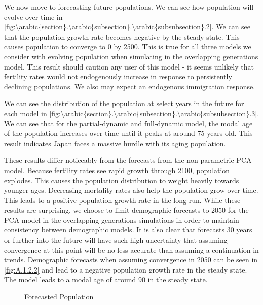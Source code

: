 \documentclass[10pt]{article}
\renewcommand{\thesection}{\arabic{section}}
\renewcommand{\thesubsection}{\thesection.\arabic{subsection}}
\renewcommand{\thesubsubsection}{\thesubsection.\arabic{subsubsection}}
\numberwithin{equation}{subsection}
\newcommand*{\FigureDir}{../../graphs}
\begin{document}
\par We now move to forecasting future populations. We can see how population will evolve over time in \autoref{fig:\thesubsubsection.2}. We can see that the population growth rate becomes negative by the steady state. This causes population to converge to 0 by 2500. This is true for all three models we consider with evolving population when simulating in the overlapping generations model. This result should caution any user of this model - it seems unlikely that fertility rates would not endogenously increase in response to persistently declining populations. We also may expect an endogenous immigration response.

\par We can see the distribution of the population at select years in the future for each model in \autoref{fig:\thesubsubsection.3}. We can see that for the partial-dynamic and full-dynamic model, the modal age of the population increases over time until it peaks at around 75 years old. This result indicates Japan faces a massive hurdle with its aging population.

\par These results differ noticeably from the forecasts from the non-parametric PCA model. Because fertility rates see rapid growth through 2100, population explodes. This causes the population distribution to weight heavily towards younger ages. Decreasing mortality rates also help the population grow over time. This leads to a positive population growth rate in the long-run. While these results are surprising, we choose to limit demographic forecasts to 2050 for the PCA model in the overlapping generations simulations in order to maintain consistency between demographic models. It is also clear that forecasts 30 years or further into the future will have such high uncertainty that assuming convergence at this point will be no less accurate than assuming a continuation in trends. Demographic forecasts when assuming convergence in 2050 can be seen in \autoref{fig:A.1.2.2} and lead to a negative population growth rate in the steady state. The model leads to a modal age of around 90 in the steady state.

\begin{figure}[!ht]
   \centering
   \caption{\label{fig:\thesubsubsection.2}Forecasted Population}
\end{figure}
\end{document}
